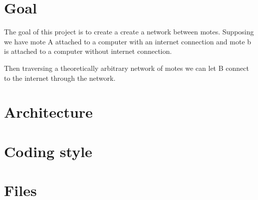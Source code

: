 \documentclass[11pt]{article}
\begin{document}
\section{Goal}
\label{sec-2}

  The goal of this project is to create a create a network between motes.
  Supposing we have mote A attached to a computer with an internet connection and mote b is attached to a computer without internet connection.

  Then traversing a theoretically arbitrary network of motes we can let B connect to the internet through the network.
\section{Architecture}
\label{sec-3}

  
\section{Coding style}
\label{sec-4}
\section{Files}
\label{sec-5}
\end{document}
